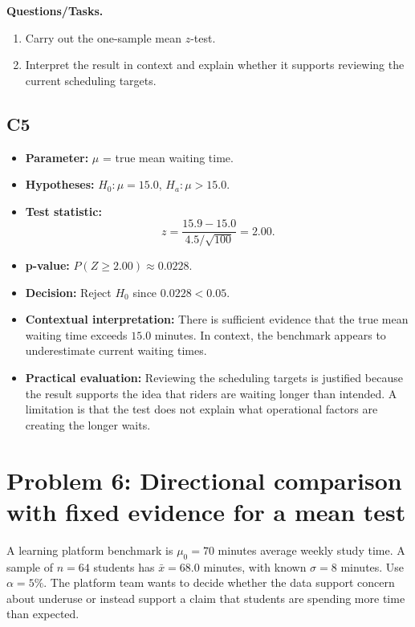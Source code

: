 	\textbf{Questions/Tasks.}
	\begin{enumerate}
		\item[(a)] Carry out the one-sample mean \(z\)-test.
		\item[(b)] Interpret the result in context and explain whether it supports reviewing the current scheduling targets.
	\end{enumerate}
	
	\subsection*{C5}
	\begin{itemize}
		\item \textbf{Parameter:} \(\mu\) = true mean waiting time.
		\item \textbf{Hypotheses:} \(H_0:\mu=15.0\), \(H_a:\mu>15.0\).
		\item \textbf{Test statistic:}
		\[
		z=\frac{15.9-15.0}{4.5/\sqrt{100}}=2.00.
		\]
		\item \textbf{p-value:} \(P(Z\ge2.00)\approx0.0228\).
		\item \textbf{Decision:} Reject \(H_0\) since \(0.0228<0.05\).
		\item \textbf{Contextual interpretation:} There is sufficient evidence that the true mean waiting time exceeds \(15.0\) minutes. In context, the benchmark appears to underestimate current waiting times.
		\item \textbf{Practical evaluation:} Reviewing the scheduling targets is justified because the result supports the idea that riders are waiting longer than intended. A limitation is that the test does not explain what operational factors are creating the longer waits.
	\end{itemize}
	
	\begin{center}
	\end{center}
	
	\section{Problem 6: Directional comparison with fixed evidence for a mean test}
	A learning platform benchmark is \(\mu_0=70\) minutes average weekly study time. A sample of \(n=64\) students has \(\bar x=68.0\) minutes, with known \(\sigma=8\) minutes. Use \(\alpha=5\%\). The platform team wants to decide whether the data support concern about underuse or instead support a claim that students are spending more time than expected.
	
